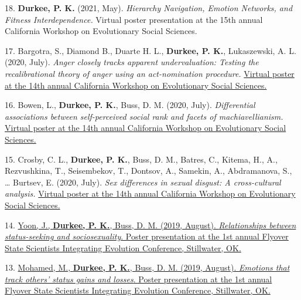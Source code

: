 \documentclass[10pt,]{article}
\begin{document}
18. \hangindent=0.5in \textbf{Durkee, P. K.} (2021, May).
\emph{Hierarchy Navigation, Emotion Networks, and Fitness
Interdependence.} Virtual poster presentation at the 15th annual
California Workshop on Evolutionary Social Sciences.

17. \hangindent=0.5in Bargotra,
S.\textsuperscript{\faChevronCircleDown}, Diamond
B.\textsuperscript{\faChevronCircleDown}, Duarte H.
L.\textsuperscript{\faChevronCircleDown}, \textbf{Durkee, P. K.},
Lukaszewski, A. L. (2020, July). \emph{Anger closely tracks apparent
undervaluation: Testing the recalibrational theory of anger using an
act-nomination procedure.}
\href{https://baeab2dc-9ca9-4f07-91d9-ca2bf5c551fa.filesusr.com/ugd/e82d4f_4a0dca2931c042a38b24ac60884dd5cd.pdf}{Virtual
poster at the 14th annual California Workshop on Evolutionary Social
Sciences.\textsuperscript{\faFilePdfO}}

16. \hangindent=0.5in Bowen, L.\textsuperscript{\faChevronCircleDown},
\textbf{Durkee, P. K.}, Buss, D. M. (2020, July). \emph{Differential
associations between self-perceived social rank and facets of
machiavellianism.}
\href{https://baeab2dc-9ca9-4f07-91d9-ca2bf5c551fa.filesusr.com/ugd/e82d4f_8e49b4d32561449ca6aa7ac9a82738e9.pdf}{Virtual
poster at the 14th annual California Workshop on Evolutionary Social
Sciences.\textsuperscript{\faFilePdfO}}

15. \hangindent=0.5in Crosby, C. L., \textbf{Durkee, P. K.}, Buss, D.
M., Batres, C., Kitema, H., A., Rezvushkina, T., Seisembekov, T.,
Dontsov, A., Samekin, A., Abdramanova, S., \ldots{} Burtsev, E. (2020,
July). \emph{Sex differences in sexual disgust: A cross-cultural
analysis.}
\href{https://baeab2dc-9ca9-4f07-91d9-ca2bf5c551fa.filesusr.com/ugd/e82d4f_e00c96a9623f40cd95eee2aaad5e59f5.pdf}{Virtual
poster at the 14th annual California Workshop on Evolutionary Social
Sciences.\textsuperscript{\faFilePdfO}}

14. \hangindent=0.5in \href{https://osf.io/uzpj5/}{Yoon,
J.\textsuperscript{\faChevronCircleDown}, \textbf{Durkee, P. K.}, Buss,
D. M. (2019, August). \emph{Relationships between status-seeking and
sociosexuality}. Poster presentation at the 1st annual Flyover State
Scientists Integrating Evolution Conference, Stillwater,
OK.\textsuperscript{\faFilePdfO}}

13. \hangindent=0.5in \href{https://osf.io/6jnz5/}{Mohamed,
M.\textsuperscript{\faChevronCircleDown}, \textbf{Durkee, P. K.}, Buss,
D. M. (2019, August). \emph{Emotions that track others' status gains and
losses}. Poster presentation at the 1st annual Flyover State Scientists
Integrating Evolution Conference, Stillwater,
OK.\textsuperscript{\faFilePdfO}}
\end{document}
